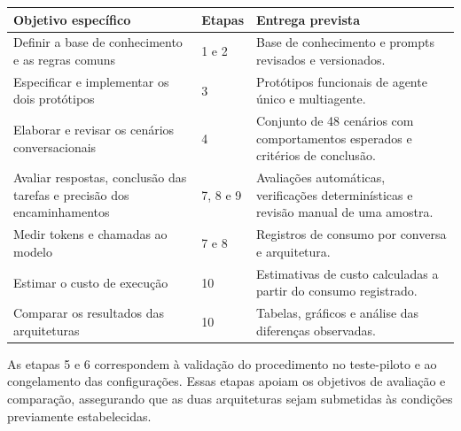 \begin{quadro}[htb]
    \centering
    \caption{Correspondência entre objetivos específicos,
    etapas e entregas previstas}
    \label{qua:objetivos-etapas}
    \small
    \begin{tabular}{p{}p{}p{}}
        \hline
        \textbf{Objetivo específico}
        & \textbf{Etapas}
        & \textbf{Entrega prevista} \\
        \hline

        Definir a base de conhecimento e as regras comuns
        & 1 e 2
        & Base de conhecimento e prompts revisados e versionados. \\

        Especificar e implementar os dois protótipos
        & 3
        & Protótipos funcionais de agente único e multiagente. \\

        Elaborar e revisar os cenários conversacionais
        & 4
        & Conjunto de 48 cenários com comportamentos esperados
        e critérios de conclusão. \\

        Avaliar respostas, conclusão das tarefas
        e precisão dos encaminhamentos
        & 7, 8 e 9
        & Avaliações automáticas, verificações determinísticas
        e revisão manual de uma amostra. \\

        Medir tokens e chamadas ao modelo
        & 7 e 8
        & Registros de consumo por conversa e arquitetura. \\

        Estimar o custo de execução
        & 10
        & Estimativas de custo calculadas a partir
        do consumo registrado. \\

        Comparar os resultados das arquiteturas
        & 10
        & Tabelas, gráficos e análise das diferenças observadas. \\

        \hline
    \end{tabular}
    \fonteproprioautor
\end{quadro}

As etapas 5 e 6 correspondem à validação do procedimento
no teste-piloto e ao congelamento das configurações.
Essas etapas apoiam os objetivos de avaliação e comparação,
assegurando que as duas arquiteturas sejam submetidas
às condições previamente estabelecidas.

